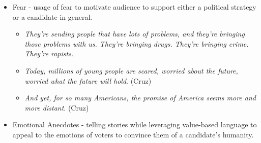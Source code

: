 \documentclass[letterpaper]{article}
\begin{document}
\begin{itemize}
	\item Fear - usage of fear to motivate audience to support either a political strategy or a candidate in general.
		\begin{itemize}
			\item \emph{They’re sending people that have lots of problems, and they’re bringing those problems with us. They’re bringing drugs. They’re bringing crime. They’re rapists.}
			\item {\em Today, millions of young people are scared, worried about the future, worried what the future will hold}. (Cruz)
        	\item  {\em And yet, for so many Americans, the promise of America seems more and more distant}. (Cruz)
		\end{itemize}
	\item Emotional Anecdotes - telling stories while leveraging value-based language to appeal to the emotions of voters to convince them of a candidate's humanity.
\end{itemize}
\end{document}
